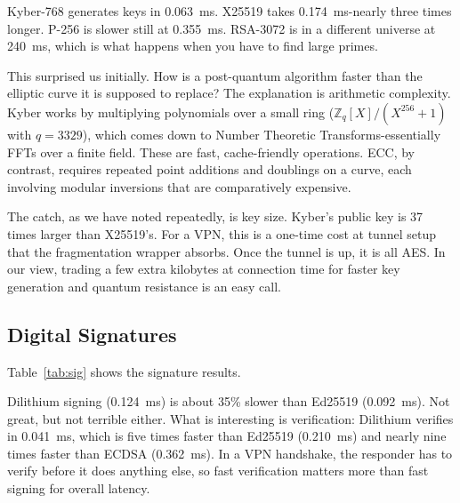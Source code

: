 \documentclass[10pt, conference, letterpaper]{IEEEtran}
\begin{document}
Kyber-768 generates keys in 0.063~ms. X25519 takes 0.174~ms-nearly three times longer. P-256 is slower still at 0.355~ms. RSA-3072 is in a different universe at 240~ms, which is what happens when you have to find large primes.

This surprised us initially. How is a post-quantum algorithm faster than the elliptic curve it is supposed to replace? The explanation is arithmetic complexity. Kyber works by multiplying polynomials over a small ring ($\mathbb{Z}_q[X]/(X^{256}+1)$ with $q=3329$), which comes down to Number Theoretic Transforms-essentially FFTs over a finite field. These are fast, cache-friendly operations. ECC, by contrast, requires repeated point additions and doublings on a curve, each involving modular inversions that are comparatively expensive.

The catch, as we have noted repeatedly, is key size. Kyber's public key is 37 times larger than X25519's. For a VPN, this is a one-time cost at tunnel setup that the fragmentation wrapper absorbs. Once the tunnel is up, it is all AES. In our view, trading a few extra kilobytes at connection time for faster key generation and quantum resistance is an easy call.

\subsection{Digital Signatures}
Table~\ref{tab:sig} shows the signature results.

\begin{table}[hbt!]
\centering
\caption{Digital Signature Performance (mean of 25 iterations)}
\label{tab:sig}
\end{table}

Dilithium signing (0.124~ms) is about 35\% slower than Ed25519 (0.092~ms). Not great, but not terrible either. What is interesting is verification: Dilithium verifies in 0.041~ms, which is five times faster than Ed25519 (0.210~ms) and nearly nine times faster than ECDSA (0.362~ms). In a VPN handshake, the responder has to verify before it does anything else, so fast verification matters more than fast signing for overall latency.
\end{document}

